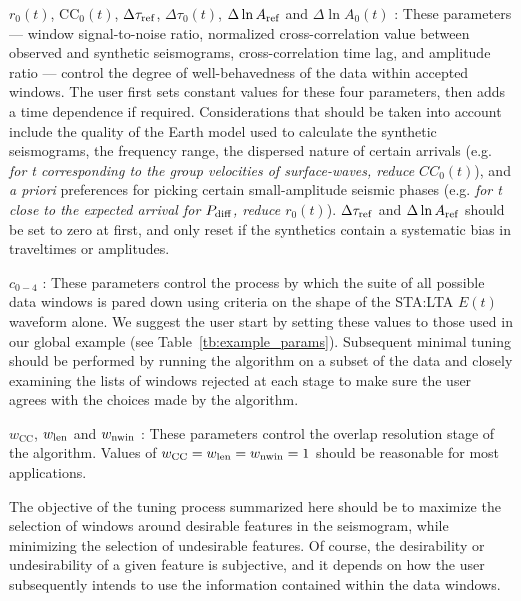 $r_0(t)$, $\mathrm{CC}_0(t)$, $\Delta \tau_{\rm ref}$, $\Delta
\tau_0(t)$, $\Delta \ln A_{\rm ref}$ and $\Delta \ln A_0(t)$ : These parameters ---
window signal-to-noise ratio, normalized cross-correlation value between
observed and synthetic seismograms, cross-correlation time lag, and amplitude
ratio --- control the degree of well-behavedness of the data within accepted
windows.  The user first sets constant values for these four parameters, then
adds a time dependence if required.  Considerations that should be taken into
account include the quality of the Earth model used to calculate the synthetic
seismograms, the frequency range, the dispersed nature of certain arrivals (e.g.
{\em for t corresponding to the group velocities of surface-waves, reduce
$CC_0(t)$}), and {\em a priori} preferences for picking certain small-amplitude seismic phases
(e.g. {\em for t close to the expected arrival for $P_{\rm diff}$, reduce $r_0(t)$}).  
$\Delta \tau_{\rm ref}$ and $\Delta \ln A_{\rm ref}$ should be set to zero at first, and only
reset if the synthetics contain a systematic bias in traveltimes or amplitudes.


$c_{0-4}$ : These parameters control the process by which the suite of all possible data windows is pared down using criteria on the shape of the STA:LTA $E(t)$ waveform alone.  We suggest the user start by setting these values to those used in our global example (see Table~\ref{tb:example_params}).  Subsequent minimal tuning should be performed by running the algorithm on a subset of the data and closely examining the lists of windows rejected at each stage to make sure the user agrees with the choices made by the algorithm.  

$w_{\mathrm{CC}}$, $w_{\rm len}$ and $w_{\rm nwin}$ : These parameters control the overlap resolution stage of the algorithm.  Values of $w_{\mathrm{CC}}= w_{\rm len} = w_{\rm nwin} = 1$ should be reasonable for most applications.

The objective of the tuning process summarized here should be to maximize the selection of windows around desirable features in the seismogram, while minimizing the selection of undesirable features.
Of course, the desirability or undesirability of a given feature is subjective, and it depends on how the user subsequently intends to use the information contained within the data windows.

